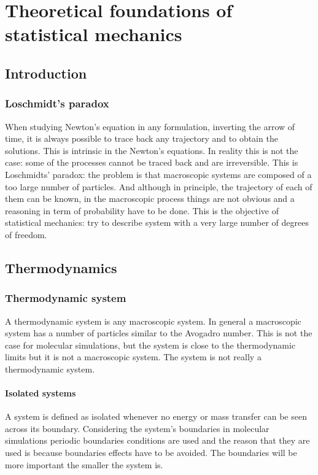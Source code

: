 \chapter{Theoretical foundations of statistical mechanics}

\section{Introduction}

	\subsection{Loschmidt's paradox}
	When studying Newton's equation in any formulation, inverting the arrow of time, it is always possible to trace back any trajectory and to obtain the solutions.
	This is intrinsic in the Newton's equations.
	In reality this is not the case: some of the processes cannot be traced back and are irreversible.
	This is	Loschmidts' paradox: the problem is that macroscopic systems are composed of a too large number of particles.
	And although in principle, the trajectory of each of them can be known, in the macroscopic process things are not obvious and a reasoning in term of probability have to be done.
	This is the objective of statistical mechanics: try to describe system with a very large number of degrees of freedom.

\section{Thermodynamics}

	\subsection{Thermodynamic system}
	A thermodynamic system is any macroscopic system.
	In general a macroscopic system has a number of particles similar to the Avogadro number.
	This is not the case for molecular simulations, but the system is close to the thermodynamic limits but it is not a macroscopic system.
	The system is not really a thermodynamic system.

		\subsubsection{Isolated systems}
		A system is defined as isolated whenever no energy or mass transfer can be seen across its boundary.
		Considering the system's boundaries in molecular simulations periodic boundaries conditions are used and the reason that they are used is because boundaries effects have to be avoided.
		The boundaries will be more important the smaller the system is.


